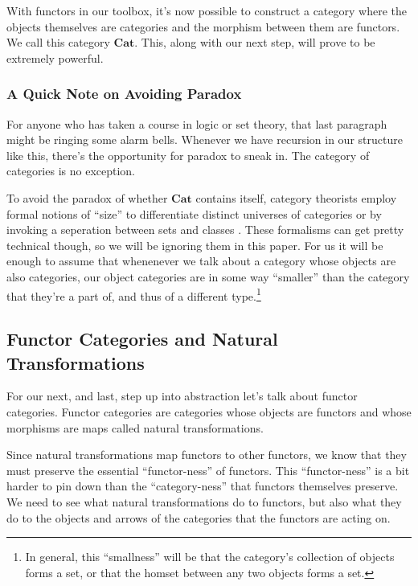 \documentclass[12pt]{article}
\begin{document}
With functors in our toolbox, it's now possible to construct a category where the objects themselves are categories and the morphism between them are functors.
We call this category $\mathbf{Cat}$.
This, along with our next step, will prove to be extremely powerful.

\subsubsection*{A Quick Note on Avoiding Paradox}
For anyone who has taken a course in logic or set theory, that last paragraph might be ringing some alarm bells.
Whenever we have recursion in our structure like this, there's the opportunity for paradox to sneak in.
The category of categories is no exception.

To avoid the paradox of whether $\mathbf{Cat}$ contains itself, category theorists employ formal notions of ``size'' to differentiate distinct universes of categories or by invoking a seperation between sets and classes \cite{goldblatt2014topoi, riehl2017category}.
These formalisms can get pretty technical though, so we will be ignoring them in this paper.
For us it will be enough to assume that whenenever we talk about a category whose objects are also categories, our object categories are in some way ``smaller'' than the category that they're a part of, and thus of a different type.\footnote{In general, this ``smallness'' will be that the category's collection of objects forms a set, or that the homset between any two objects forms a set.}

\subsection*{Functor Categories and Natural Transformations}
For our next, and last, step up into abstraction let's talk about functor categories.
Functor categories are categories whose objects are functors and whose morphisms are maps called natural transformations.

Since natural transformations map functors to other functors, we know that they must preserve the essential ``functor-ness'' of functors.
This ``functor-ness'' is a bit harder to pin down than the ``category-ness'' that functors themselves preserve.
We need to see what natural transformations do to functors, but also what they do to the objects and arrows of the categories that the functors are acting on.
\end{document}

